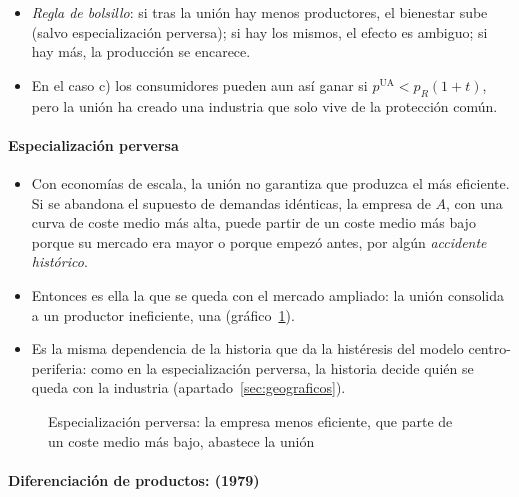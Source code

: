 \documentclass[11pt]{article}
\begin{document}
\begin{itemize}
\item \emph{Regla de bolsillo}: si tras la unión hay menos productores, el bienestar sube (salvo especialización perversa); si hay los mismos, el efecto es ambiguo; si hay más, la producción se encarece.
\item En el caso c) los consumidores pueden aun así ganar si $p^{\mathrm{UA}}<p_R(1+t)$, pero la unión ha creado una industria que solo vive de la protección común.
\end{itemize}

\paragraph{Especialización perversa}

\begin{itemize}
\item Con economías de escala, la unión no garantiza que produzca el más eficiente. Si se abandona el supuesto de demandas idénticas, la empresa de $A$, con una curva de coste medio más alta, puede partir de un coste medio más bajo porque su mercado era mayor o porque empezó antes, por algún \emph{accidente histórico}.
\item Entonces es ella la que se queda con el mercado ampliado: la unión consolida a un productor ineficiente, una  (gráfico~\ref{fig:especializacion-perversa}).
\item Es la misma dependencia de la historia que da la histéresis del modelo centro-periferia: como en la especialización perversa, la historia decide quién se queda con la industria (apartado~\ref{sec:geograficos}).
\end{itemize}

\begin{figure}[H]
\centering
\caption{Especialización perversa: la empresa menos eficiente, que parte de un coste medio más bajo, abastece la unión}\label{fig:especializacion-perversa}
\end{figure}

\paragraph{Diferenciación de productos:  (1979)}
\end{document}
